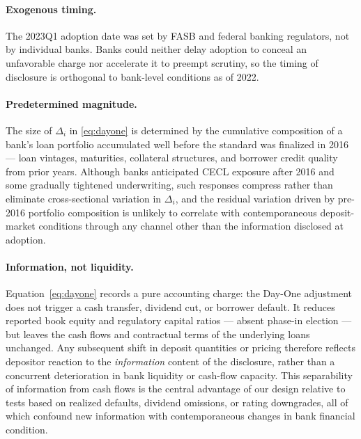 \paragraph{Exogenous timing.}
The 2023Q1 adoption date was set by FASB and federal banking regulators, not by
individual banks. Banks could neither delay adoption to conceal an unfavorable
charge nor accelerate it to preempt scrutiny, so the timing of disclosure is
orthogonal to bank-level conditions as of 2022.

\paragraph{Predetermined magnitude.}
The size of $\Delta_i$ in \eqref{eq:dayone} is determined by the cumulative
composition of a bank's loan portfolio accumulated well before the standard was
finalized in 2016 — loan vintages, maturities, collateral structures, and
borrower credit quality from prior years. Although banks anticipated CECL exposure
after 2016 and some gradually tightened underwriting, such responses compress
rather than eliminate cross-sectional variation in $\Delta_i$, and the residual
variation driven by pre-2016 portfolio composition is unlikely to correlate with
contemporaneous deposit-market conditions through any channel other than the
information disclosed at adoption.

\paragraph{Information, not liquidity.}
Equation~\eqref{eq:dayone} records a pure accounting charge: the Day-One
adjustment does not trigger a cash transfer, dividend cut, or borrower default.
It reduces reported book equity and regulatory capital ratios — absent phase-in
election — but leaves the cash flows and contractual terms of the underlying loans
unchanged. Any subsequent shift in deposit quantities or pricing therefore reflects
depositor reaction to the \textit{information} content of the disclosure, rather
than a concurrent deterioration in bank liquidity or cash-flow capacity. This
separability of information from cash flows is the central advantage of our
design relative to tests based on realized defaults, dividend omissions, or rating
downgrades, all of which confound new information with contemporaneous changes in
bank financial condition.

